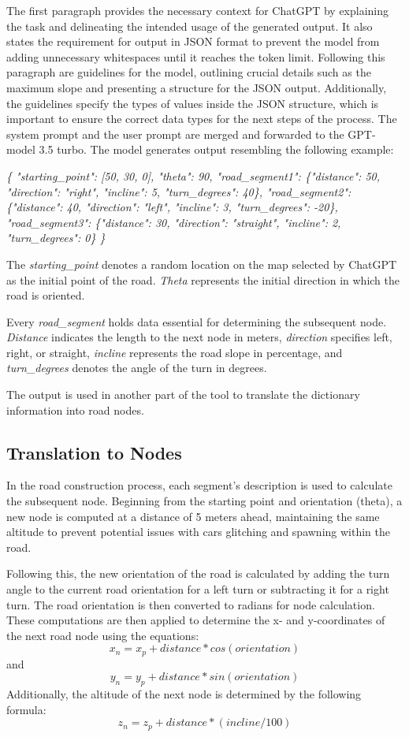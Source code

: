 The first paragraph provides the necessary context for ChatGPT by explaining the task and delineating the intended usage of the generated output. It also states the requirement for output in JSON format to prevent the model from adding unnecessary whitespaces until it reaches the token limit.
Following this paragraph are guidelines for the model, outlining crucial details such as the maximum slope and presenting a structure for the JSON output. Additionally, the guidelines specify the types of values inside the JSON structure, which is important to ensure the correct data types for the next steps of the process.
The system prompt and the user prompt are merged and forwarded to the GPT-model 3.5 turbo. The model generates output resembling the following example:

\textit{\{
  "starting\_point": [50, 30, 0],
  "theta": 90,
  "road\_segment1": \{"distance": 50, "direction": "right", "incline": 5, "turn\_degrees": 40\},
  "road\_segment2": \{"distance": 40, "direction": "left", "incline": 3, "turn\_degrees": -20\},
  "road\_segment3": \{"distance": 30, "direction": "straight", "incline": 2, "turn\_degrees": 0\}
\}}

The \textit{starting\_point} denotes a random location on the map selected by ChatGPT as the initial point of the road. 
\textit{Theta} represents the initial direction in which the road is oriented.

Every \textit{road\_segment} holds data essential for determining the subsequent node. \textit{Distance} indicates the length to the next node in meters, \textit{direction} specifies left, right, or straight, \textit{incline} represents the road slope in percentage, and \textit{turn\_degrees} denotes the angle of the turn in degrees.


The output is used in another part of the tool to translate the dictionary information into road nodes.

\subsection{Translation to Nodes}


In the road construction process, each segment's description is used to calculate the subsequent node. Beginning from the starting point and orientation (theta), a new node is computed at a distance of 5 meters ahead, maintaining the same altitude to prevent potential issues with cars glitching and spawning within the road.

Following this, the new orientation of the road is calculated by adding the turn angle to the current road orientation for a left turn or subtracting it for a right turn. The road orientation is then converted to radians for node calculation. These computations are then applied to determine the x- and y-coordinates of the next road node using the equations: \[x_n = x_p + distance * cos(orientation)\] and \[y_n = y_p + distance * sin(orientation)\] 
Additionally, the altitude of the next node is determined by the following formula:
\[z_n = z_p + distance * (incline / 100)\]

